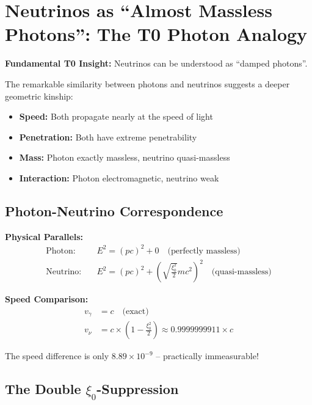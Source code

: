 \documentclass[12pt,a4paper]{article}
\newcommand{\xipar}{\xi_0}
\begin{document}
	\section{Neutrinos as ``Almost Massless Photons'': The T0 Photon Analogy}
	
	\begin{speculation}
		\textbf{Fundamental T0 Insight:} Neutrinos can be understood as ``damped photons''.
		
		The remarkable similarity between photons and neutrinos suggests a deeper geometric kinship:
		\begin{itemize}
			\item \textbf{Speed:} Both propagate nearly at the speed of light
			\item \textbf{Penetration:} Both have extreme penetrability
			\item \textbf{Mass:} Photon exactly massless, neutrino quasi-massless
			\item \textbf{Interaction:} Photon electromagnetic, neutrino weak
		\end{itemize}
	\end{speculation}
	
	\subsection{Photon-Neutrino Correspondence}
	
	\begin{photon}
		\textbf{Physical Parallels:}
		\begin{align}
			\text{Photon:} \quad &E^2 = (pc)^2 + 0 \quad \text{(perfectly massless)} \\
			\text{Neutrino:} \quad &E^2 = (pc)^2 + \left(\sqrt{\frac{\xipar^2}{2}} m c^2\right)^2 \quad \text{(quasi-massless)}
		\end{align}
		
		\textbf{Speed Comparison:}
		\begin{align}
			v_\gamma &= c \quad \text{(exact)} \\
			v_\nu &= c \times \left(1 - \frac{\xipar^2}{2}\right) \approx 0.9999999911 \times c
		\end{align}
		
		The speed difference is only $8.89 \times 10^{-9}$ -- practically immeasurable!
	\end{photon}
	
	\subsection{The Double $\xi_0$-Suppression}
	
\end{document}
